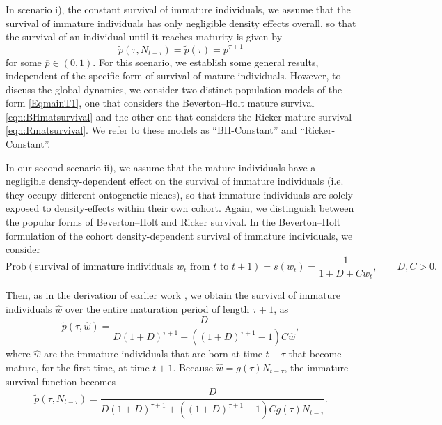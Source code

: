 \documentclass{article}
\numberwithin{theorem}{section}
\begin{document}
{In scenario i), the constant survival of immature individuals,  we assume that the survival of immature individuals has only negligible density effects overall, so that the survival of an individual until it reaches maturity is given by
\begin{equation} \label{eqn:constantimmature}
    \widetilde{p}(\tau, N_{t-\tau})=\widetilde{p}(\tau)=\overline{p}^{\tau+1}
\end{equation}
for some $\overline{p}\in (0,1)$. For this scenario, we establish some general results, independent of the specific form of survival of mature individuals. However, to discuss the global dynamics, we consider two distinct population models of the form \eqref{EqmainT1}, one that considers the Beverton--Holt mature survival \eqref{eqn:BHmatsurvival} and the other one that considers the Ricker mature survival \eqref{eqn:Rmatsurvival}. We refer to these models as ``BH-Constant'' and ``Ricker-Constant''.

In our second scenario ii), we assume that the mature individuals have a negligible density-dependent effect on the survival of immature individuals (i.e. they occupy different ontogenetic niches), so that immature individuals are solely exposed to density-effects within their own cohort. Again, we distinguish between the popular forms of Beverton--Holt and Ricker survival. In the Beverton--Holt formulation of the cohort density-dependent survival of immature individuals, we consider
    $$\mbox{Prob}(\mbox{survival of immature individuals $w_t$ from $t$ to $t+1$}) =s(w_t)=\frac{1}{1+D+Cw_t}, \qquad D, C>0.$$

 Then, as in the derivation of earlier work \cite{StWodelay2}, we obtain the survival of immature individuals $\hat{w}$ over the entire maturation period of length $\tau+1$, as 
 $$\widetilde{p}(\tau, \hat{w})=\frac{D}{D(1+D)^{\tau+1}+((1+D)^{\tau+1}-1)C\hat{w}},$$
 where $\hat{w}$ are the immature individuals that are born at time $t-\tau$ that become mature, for the first time, at time $t+1$. Because $\hat{w}=g(\tau)N_{t-\tau}$, the immature survival function becomes
\begin{equation}\label{eq:BHimmsurvival}
\widetilde{p}(\tau, N_{t-\tau})=
\frac{D}{D(1+D)^{\tau+1}+((1+D)^{\tau+1}-1)Cg(\tau)N_{t-\tau}}.
\end{equation}

}
\end{document}
